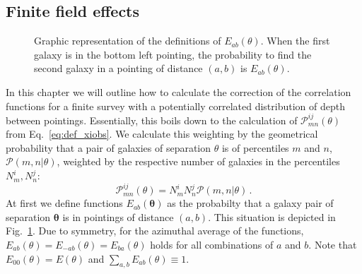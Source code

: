 \documentclass{aa}
\def\b#1{\bm{#1}}
\begin{document}
\begin{appendix}
\section{Finite field effects}
\label{sec:expand_eoftheta}
\begin{figure}
    \sidecaption
    \centering
    \def\svgwidth{200pt}    
      
    \caption{Graphic representation of the definitions of $E_{ab}(\theta)$. When the first galaxy is in the bottom left pointing, the probability to find the second galaxy in a pointing of distance $(a,b)$ is $E_{ab}(\theta)$.}
    \label{fig:expand_etheta}
\end{figure}
In this chapter we will outline how to calculate the correction of the correlation functions for a finite survey with a potentially correlated distribution of depth between pointings. Essentially, this boils down to the calculation of $\mathcal{P}_{mn}^{ij}(\theta)$ from Eq.~\eqref{eq:def_xiobs}. We calculate this weighting by the geometrical probability that a pair of galaxies of separation $\theta$ is of percentiles $m$ and $n$, $\mathcal{P}(m,n|\theta)$, weighted by the respective number of galaxies in the percentiles $N_m^i,N_n^j$: \begin{equation}
\mathcal{P}_{mn}^{ij}(\theta) = N_m^iN_n^j\mathcal{P}(m,n|\theta)\, .
\label{eq:pmnij1}
\end{equation}
 At first we define functions $E_{ab}(\b\theta)$ as the probabilty that a galaxy pair of separation $\b\theta$ is in pointings of distance $(a,b)$. This situation is depicted in Fig.~\ref{fig:expand_etheta}. Due to symmetry, for the azimuthal average of the functions, $E_{ab}(\theta) = E_{-ab}(\theta) = E_{ba}(\theta)$ holds for all combinations of $a$ and $b$. Note that $E_{00}(\theta)=E(\theta)$ and $\sum_{a,b}E_{ab}(\theta)\equiv 1$.


\end{appendix}
\end{document}
